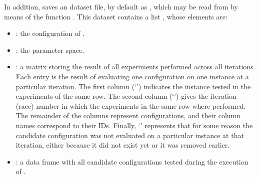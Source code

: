 \documentclass[article,a4paper,nojss,notitle]{jss}
\newcommand{\irace}{\pkg{irace}\xspace}
\newcommand{\SoftwarePackage}{\pkg}
\newcommand{\SPEAR}{\SoftwarePackage{SPEAR}\xspace}
\begin{document}
In addition, \irace saves an  dataset file, by
default as , which may be read from 
by means of the function . This dataset contains a list , whose elements are: 

\begin{itemize}
\item {}: the configuration of \irace.
\item {}: the parameter space.
\item {}: a matrix storing the result of all
  experiments performed across all iterations. Each entry is the
  result of evaluating one configuration on one instance at a
  particular iteration. The first column (`') indicates
  the instance tested in the experiments of the same row.  The second
  column (`') gives the iteration (race) number in
  which the experiments in the same row where performed. The remainder
  of the columns represent configurations, and their column names
  correspond to their IDs. Finally, `' represents that for some
  reason the candidate configuration was not evaluated on a particular instance at
  that iteration, either because it did not exist yet or it was removed
  earlier.
\item {}: a data frame with all candidate
  configurations tested during the execution of \irace.
\end{itemize}



\end{document}
